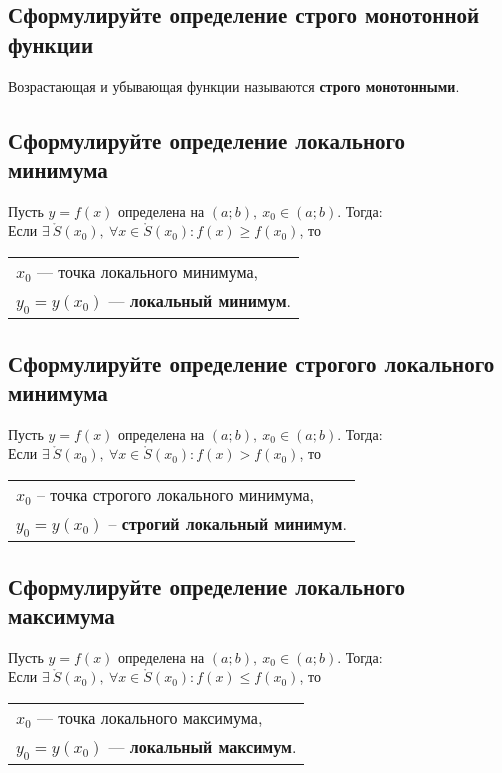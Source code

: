 \subsection{Сформулируйте определение строго монотонной функции}
\begin{definition}
    Возрастающая и убывающая функции называются \textbf{строго монотонными}.
\end{definition}

\subsection{Сформулируйте определение локального минимума}
\begin{definition}
	Пусть $y=f(x)$ определена на $(a;b),\ x_0 \in (a;b)$. Тогда:\\[1ex]
	Если $\exists\ \mathring{S}(x_0),\ \forall x \in \mathring{S}(x_0)\colon f(x) \ge f(x_0)$, то \begin{tabular}{l} $x_0$ --- точка локального минимума, \\ $y_0 = y(x_0)$ --- \textbf{локальный минимум}. \end{tabular}
\end{definition}

\subsection{Сформулируйте определение строгого локального минимума}
\begin{definition}
	Пусть $y=f(x)$ определена на $(a;b),\ x_0 \in (a;b)$. Тогда:\\[1ex]
	Если $\exists\ \mathring{S}(x_0),\ \forall x \in \mathring{S}(x_0)\colon f(x) > f(x_0)$, то \begin{tabular}{l} $x_0$ -- \small{точка строгого локального минимума}, \\ $y_0 = y(x_0)$ -- \small{\textbf{строгий локальный минимум}}. \end{tabular}
\end{definition}

\subsection{Сформулируйте определение локального максимума}
\begin{definition}
	Пусть $y=f(x)$ определена на $(a;b),\ x_0 \in (a;b)$. Тогда:\\[1ex]
	Если $\exists\ \mathring{S}(x_0),\ \forall x \in \mathring{S}(x_0)\colon f(x) \le f(x_0)$, то \begin{tabular}{l} $x_0$ --- точка локального максимума, \\ $y_0 = y(x_0)$ --- \textbf{локальный максимум}. \end{tabular}
\end{definition}

